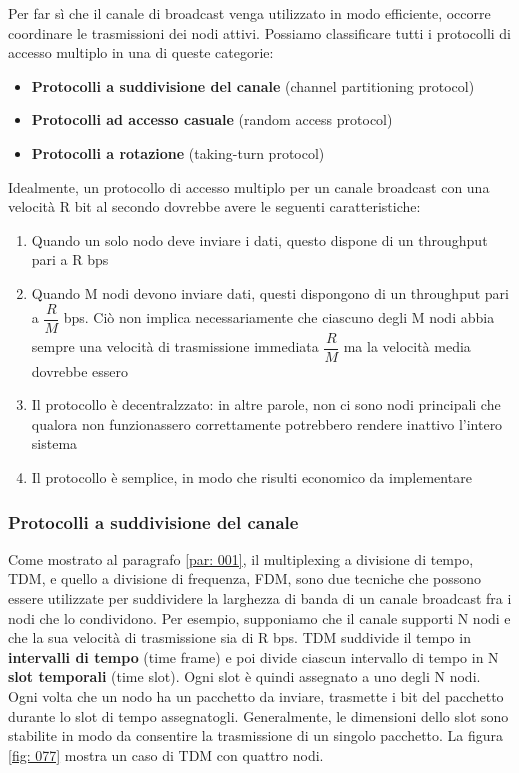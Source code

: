 \documentclass[11pt,a4paper]{article}
\begin{document}
Per far sì che il canale di broadcast venga utilizzato in modo efficiente, occorre coordinare le trasmissioni dei nodi attivi. Possiamo classificare tutti i protocolli di accesso multiplo in una di queste categorie:
\begin{itemize}
	\item \textbf{Protocolli a suddivisione del canale} (channel partitioning protocol)
	\item \textbf{Protocolli ad accesso casuale} (random access protocol)
	\item \textbf{Protocolli a rotazione }(taking-turn protocol)
\end{itemize}
Idealmente, un protocollo di accesso multiplo per un canale broadcast con una velocità R bit al secondo dovrebbe avere le seguenti caratteristiche:
\begin{enumerate}
	\item Quando un solo nodo deve inviare i dati, questo dispone di un throughput pari a R bps
	\item Quando M nodi devono inviare dati, questi dispongono di un throughput pari a $\dfrac{R}{M}$ bps. Ciò non implica necessariamente che ciascuno degli M nodi abbia sempre una velocità di trasmissione immediata $\dfrac{R}{M}$ ma la velocità media dovrebbe essero
	\item Il protocollo è decentralzzato: in altre parole, non ci sono nodi principali che qualora non funzionassero correttamente potrebbero rendere inattivo l'intero sistema
	\item Il protocollo è semplice, in modo che risulti economico da implementare
\end{enumerate}

\subsubsection{Protocolli a suddivisione del canale}
Come mostrato al paragrafo \ref{par: 001}, il multiplexing a divisione di tempo, TDM, e quello a divisione di frequenza, FDM, sono due tecniche che possono essere utilizzate per suddividere la larghezza di banda di un canale broadcast fra i nodi che lo condividono. Per esempio, supponiamo che il canale supporti N nodi e che la sua velocità di trasmissione sia di R bps. TDM suddivide il tempo in \textbf{intervalli di tempo} (time frame) e poi divide ciascun intervallo di tempo in N \textbf{slot temporali} (time slot). Ogni slot è quindi assegnato a uno degli N nodi. Ogni volta che un nodo ha un pacchetto da inviare, trasmette i bit del pacchetto durante lo slot di tempo assegnatogli. Generalmente, le dimensioni dello slot sono stabilite in modo da consentire la trasmissione di un singolo pacchetto. La figura \ref{fig: 077} mostra un caso di TDM con quattro nodi.
\end{document}
